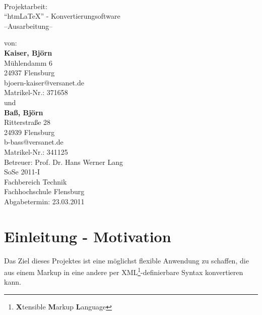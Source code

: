 \documentclass[	a4paper,		%
		titlepage, 		%
		fontsize=12pt		%
		]{scrartcl} 		%
\begin{document}
\begin{titlepage}
\centering
\resizebox*{.25\textheight}{!}{} \\
\vspace{1cm}
\Large Projektarbeit: \\ ``htm\LaTeX'' - Konvertierungsoftware\\ --Ausarbeitung--
\vspace{2cm}
\vfill
\begin{flushleft}			%
\noindent
\normalsize
von:\\ \textbf{Kaiser, Björn} \\Mühlendamm 6\\24937 Flensburg\\bjoern-kaiser@versanet.de\\ Matrikel-Nr.: 371658\\ \vspace{.5cm}
und\\ \vspace{.5cm}
\textbf{Baß, Björn} \\Ritterstraße 28\\24939 Flensburg\\b-bass@versanet.de\\ Matrikel-Nr.: 341125\\ \vspace{1cm}
\large Betreuer: Prof. Dr. Hans Werner Lang\\
SoSe 2011-I\\
Fachbereich Technik\\
Fachhochschule Flensburg\\\vspace{.5em}
Abgabetermin: 23.03.2011
\end{flushleft}
\end{titlepage}

\newpage				%
\tableofcontents			%
\thispagestyle{empty}			%
\newpage				%

\section{Einleitung - Motivation}
Das Ziel dieses Projektes ist eine möglichst flexible Anwendung zu schaffen, die aus einem Markup in eine andere per XML\footnote{\textbf{X}tensible \textbf{M}arkup \textbf{L}anguage}-definierbare Syntax konvertieren kann.
\end{document}
